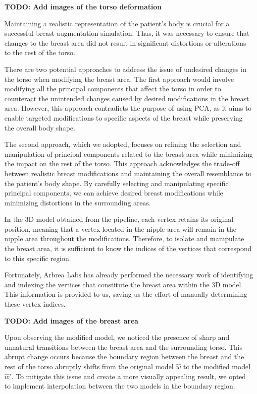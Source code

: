 \textbf{TODO: Add images of the torso deformation}

Maintaining a realistic representation of the patient's body is crucial for a successful breast augmentation simulation. Thus, it was necessary to ensure that changes to the breast 
area did not result in significant distortions or alterations to the rest of the torso.

There are two potential approaches to address the issue of undesired changes in the torso when modifying the breast area. The first approach would involve modifying all the 
principal components that affect the torso in order to counteract the unintended changes caused by desired modifications in the breast area. However, 
this approach contradicts the purpose of using PCA, as it aims to enable targeted modifications to specific aspects of the breast while preserving the overall body shape.

The second approach, which we adopted, focuses on refining the selection and manipulation of principal components related to the breast area while minimizing the impact on the rest of the torso. 
This approach acknowledges the trade-off between realistic breast modifications and maintaining the overall resemblance to the patient's body shape. By carefully selecting and manipulating 
specific principal components, we can achieve desired breast modifications while minimizing distortions in the surrounding areas.

In the 3D model obtained from the pipeline, each vertex retains its original position, meaning that a vertex located in the nipple area will remain in the nipple area throughout the modifications. 
Therefore, to isolate and manipulate the breast area, it is sufficient to know the indices of the vertices that correspond to this specific region.

Fortunately, Arbrea Labs has already performed the necessary work of identifying and indexing the vertices that constitute the breast area within the 3D model. This information is provided to us, 
saving us the effort of manually determining these vertex indices.

\textbf{TODO: Add images of the breast area}

Upon observing the modified model, we noticed the presence of sharp and unnatural transitions between the breast area and the surrounding torso. This abrupt change occurs because the boundary 
region between the breast and the rest of the torso abruptly shifts from the original model $\hat{w}$ to the modified model $\hat{w}'$. To mitigate this issue and create a more visually 
appealing result, we opted to implement interpolation between the two models in the boundary region.

